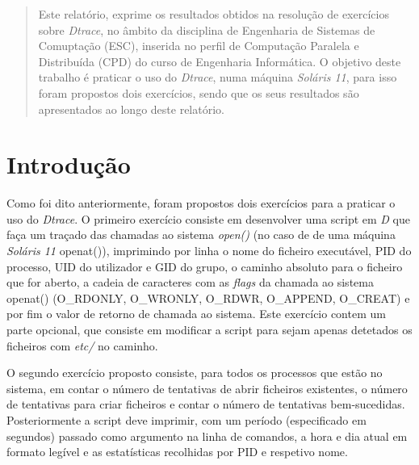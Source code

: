 \documentclass[conference,compsoc]{IEEEtran}
\begin{document}
\maketitle
\tableofcontents
\vspace{0.5cm}
\begin{abstract}
Este relatório, exprime os resultados obtidos na resolução de exercícios sobre \textit{Dtrace}, no âmbito da disciplina de Engenharia de Sistemas de Comuptação (ESC), inserida no perfil de Computação Paralela e Distribuída (CPD) do curso de Engenharia Informática. O objetivo deste trabalho é praticar o uso do \textit{Dtrace}, numa máquina \textit{Soláris 11}, para isso foram propostos dois exercícios, sendo que os seus resultados são apresentados ao longo deste relatório. 
\end{abstract}





%
\IEEEpeerreviewmaketitle



\section{Introdução}
Como foi dito anteriormente, foram propostos dois exercícios para a praticar o uso do \textit{Dtrace}. O primeiro exercício consiste em desenvolver uma script em \textit{D} que faça um traçado das chamadas ao sistema \textit{open()} (no caso de de uma máquina \textit{Soláris 11} openat()), imprimindo por linha o nome do ficheiro executável, PID do processo, UID do utilizador e GID do grupo, o caminho absoluto para o ficheiro que for aberto, a cadeia de caracteres com as \textit{flags} da chamada ao sistema openat() (O\_RDONLY, O\_WRONLY, O\_RDWR, O\_APPEND, O\_CREAT) e por fim o valor de retorno de chamada ao sistema. Este exercício contem um parte opcional, que consiste em modificar a script para sejam apenas detetados os ficheiros com \textit{etc/} no caminho.

O segundo exercício proposto consiste, para todos os processos que estão no sistema, em contar o número de tentativas de abrir ficheiros existentes, o número de tentativas para criar ficheiros e contar o número de tentativas bem-sucedidas. Posteriormente a script deve imprimir, com um período (especificado em segundos) passado como argumento na linha de comandos, a hora e dia atual em formato legível e as estatísticas recolhidas por PID e respetivo nome. 
\end{document}
